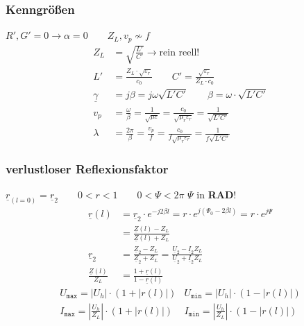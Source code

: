 \subsubsection{Kenngrößen}
$ R', G' = 0 \rightarrow \alpha = 0 \qquad Z_L, v_p \nsim f$
\begin{align*}
	Z_L                & =  \sqrt{\frac{L'}{C'}} \rightarrow \text{rein reell!}                                                                  \\
	L' & = \frac{Z_L \cdot \sqrt{\varepsilon_r}}{c_0} \qquad C' = \frac{\sqrt{\varepsilon_r}}{Z_L \cdot c_0}										 \\
	\underline{\gamma} & = j \beta  = j \omega \sqrt{L'C'} \qquad \beta = \omega \cdot \sqrt{L'C'}                                               \\
	v_p                & = \frac{\omega}{\beta} = \frac{1}{\sqrt{\mu\varepsilon}}= \frac{c_0}{\sqrt{\mu_r\varepsilon_r}} = \frac{1}{\sqrt{L'C'}} \\
	\lambda            & = \frac{2\pi}{\beta}= \frac{v_p}{f}= \frac{c_0}{f\sqrt{\mu_r\varepsilon_r}}=\frac{1}{f\sqrt{L'C'}}
\end{align*}

\subsubsection{verlustloser Reflexionsfaktor}\label{sec:verlustlos_rfaktor}
$ \underline{r}_{(l=0)} = \underline{r}_2 \qquad 0<r<1 \qquad 0<\Psi<2\pi $ \quad  $\Psi$ in \textbf{RAD}!
\begin{align*}
	\underline{r}(l)              & = \underline{r}_2 \cdot e^{-j2\beta l} = r \cdot e^{j(\Psi_0-2\beta l)} =r\cdot e^{j\Psi}                                            \\ &=\tfrac{\underline{Z}(l)-Z_L}{\underline{Z}(l)+Z_L}\\
	\underline{r}_2               & = \tfrac{\underline{Z}_2-Z_L}{\underline{Z}_2+Z_L} = \tfrac{\underline{U}_2-\underline{I}_2Z_L}{\underline{U}_2 +\underline{I}_2 Z_L} \\
	\tfrac{\underline{Z}(l)}{Z_L} & = \tfrac{1+\underline{r}(l)}{1-\underline{r}(l)}
\end{align*}
\begin{align*}
	 & U_{\texttt{max}} = |U_h| \cdot (1+|r(l)|)                            & U_{\texttt{min}} = |U_h| \cdot (1-|r(l)|)                           & \\
	 & I_{\texttt{max}} = \left | \frac{U_h}{Z_L} \right | \cdot (1+|r(l)|) & I_{\texttt{min}} = \left| \frac{U_h}{Z_L} \right| \cdot (1-|r(l)|) &
\end{align*}

